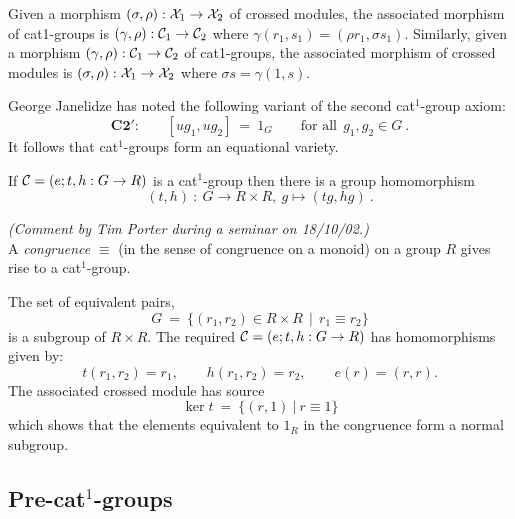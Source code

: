 Given a morphism 
$(\sigma,\rho) : \mathcal{X}_1 \to \mathcal{X}_2$ of crossed modules,
the associated morphism of cat1-groups is
$(\gamma,\rho) : \mathcal{C}_1 \to \mathcal{C}_2$ where
$\gamma(r_1,s_1) = (\rho r_1, \sigma s_1)$.
Similarly, given a morphism 
$(\gamma,\rho) : \mathcal{C}_1 \to \mathcal{C}_2$ of cat1-groups,
the associated morphism of crossed modules is
$(\sigma,\rho) : \mathcal{X}_1 \to \mathcal{X}_2$ where
$\sigma s = \gamma(1,s)$.


George Janelidze has noted the following variant of the second
cat$^1$-group axiom:
$$
\textbf{C2}'\textbf{:}  \qquad  
[ug_1,ug_2] ~=~ 1_G
\qquad \text{for all}~~ g_1,g_2 \in G~.
$$
It follows that cat$^1$-groups form an equational variety.

\begin{lem}
If  $\mathcal{C} = (e;t,h : G \to R )$  is a cat$^1$-group
then there is a group homomorphism
$$
(t,h) ~:~ G \to R \times R, ~ g \mapsto (tg,hg)~.
$$
\end{lem}


\begin{prop}
\emph{(Comment by Tim Porter during a seminar on 18/10/02.)\\}
A \emph{congruence}  $\equiv$ 
(in the sense of congruence on a monoid) 
on a group $R$ gives rise to a cat$^1$-group.
\end{prop}
\begin{pf}
The set of equivalent pairs,
$$
G ~=~ \{(r_1,r_2) \in R \times R ~~|~~ r_1 \equiv r_2 \}
$$
is a subgroup of  $R \times R$.
The required  $\mathcal{C} = (e;t,h : G \to R )$  has homomorphisms given by:
$$
t(r_1,r_2) = r_1, \qquad
h(r_1,r_2) = r_2, \qquad
e(r) = (r,r).
$$
The associated crossed module has source
$$
\ker t ~=~ \{(r,1) ~|~ r \equiv 1 \}
$$
which shows that the elements equivalent to $1_R$ in the congruence
form a normal subgroup.
\end{pf}



\subsection{Pre-cat$^1$-groups}  

